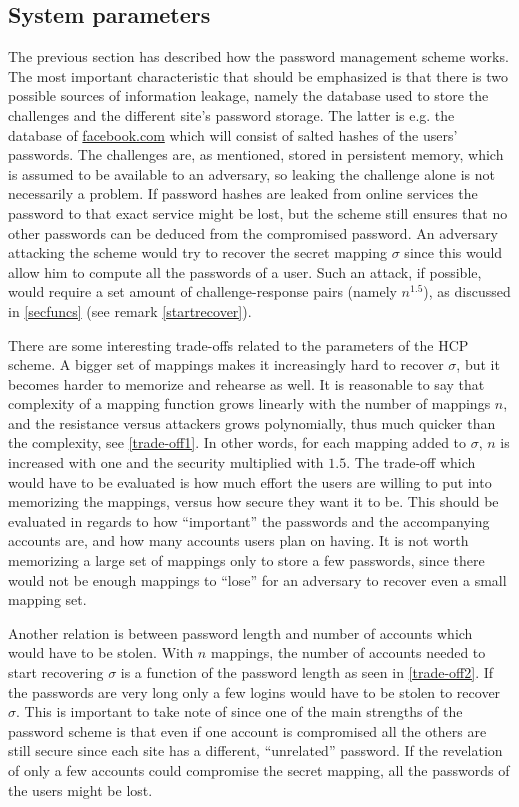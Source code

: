 \subsection{System parameters} \label{sec-params}
\par The previous section has described how the password management scheme works. The most important characteristic that should be emphasized is that there is two possible sources of information leakage, namely the database used to store the challenges and the different site's password storage. The latter is e.g. the database of \url{facebook.com} which will consist of salted hashes of the users' passwords. The challenges are, as mentioned, stored in persistent memory, which is assumed to be available to an adversary, so leaking the challenge alone is not necessarily a problem. If password hashes are leaked from online services the password to that exact service might be lost, but the scheme still ensures that no other passwords can be deduced from the compromised password. An adversary attacking the scheme would try to recover the secret mapping $\sigma$ since this would allow him to compute all the passwords of a user. Such an attack, if possible, would require a set amount of challenge-response pairs (namely $n^{1.5}$), as discussed in \autoref{secfuncs} (see remark \ref{startrecover}).
\par There are some interesting trade-offs related to the parameters of the HCP scheme. A bigger set of mappings makes it increasingly hard to recover $\sigma$, but it becomes  harder to memorize and rehearse as well. It is reasonable to say that complexity of a mapping function grows linearly with the number of mappings $n$, and the resistance versus attackers grows polynomially, thus much quicker than the complexity, see \autoref{trade-off1}. In other words, for each mapping added to $\sigma$, $n$ is increased with one and the security multiplied with $1.5$. The trade-off which would have to be evaluated is how much effort the users are willing to put into memorizing the mappings, versus how secure they want it to be. This should be evaluated in regards to how ``important'' the passwords and the accompanying accounts are, and how many accounts users plan on having. It is not worth memorizing a large set of mappings only to store a few passwords, since there would not be enough mappings to ``lose'' for an adversary to recover even a small mapping set.
\par Another relation is between password length and number of accounts which would have to be stolen. With $n$ mappings, the number of accounts needed to start recovering $\sigma$ is a function of the password length as seen in \autoref{trade-off2}. If the passwords are very long only a few logins would have to be stolen to recover $\sigma$. This is important to take note of since one of the main strengths of the password scheme is that even if one account is compromised all the others are still secure since each site has a different, ``unrelated'' password. If the revelation of only a few accounts could compromise the secret mapping, all the passwords of the users might be lost.
